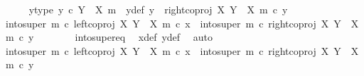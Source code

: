 \begin{isabellebody}
\ \ \ \ \isamarkupfalse%
\ y{\isacharprime}{\kern0pt}{\isacharunderscore}{\kern0pt}type{\isacharcolon}{\kern0pt}\ {\isachardoublequoteopen}y{\isacharprime}{\kern0pt}\ {\isasymin}\isactrlsub c\ Y\ {\isasymsetminus}\ {\isacharparenleft}{\kern0pt}X{\isacharcomma}{\kern0pt}\ m{\isacharparenright}{\kern0pt}{\isachardoublequoteclose}\ \ y{\isacharunderscore}{\kern0pt}def{\isacharcolon}{\kern0pt}\ {\isachardoublequoteopen}y\ {\isacharequal}{\kern0pt}\ right{\isacharunderscore}{\kern0pt}coproj\ X\ {\isacharparenleft}{\kern0pt}Y\ {\isasymsetminus}\ {\isacharparenleft}{\kern0pt}X{\isacharcomma}{\kern0pt}\ m{\isacharparenright}{\kern0pt}{\isacharparenright}{\kern0pt}\ {\isasymcirc}\isactrlsub c\ y{\isacharprime}{\kern0pt}{\isachardoublequoteclose}\isanewline
\isanewline
\ \ \ \ \isamarkupfalse%
\ {\isachardoublequoteopen}into{\isacharunderscore}{\kern0pt}super\ m\ {\isasymcirc}\isactrlsub c\ left{\isacharunderscore}{\kern0pt}coproj\ X\ {\isacharparenleft}{\kern0pt}Y\ {\isasymsetminus}\ {\isacharparenleft}{\kern0pt}X{\isacharcomma}{\kern0pt}\ m{\isacharparenright}{\kern0pt}{\isacharparenright}{\kern0pt}\ {\isasymcirc}\isactrlsub c\ x{\isacharprime}{\kern0pt}\ {\isacharequal}{\kern0pt}\ into{\isacharunderscore}{\kern0pt}super\ m\ {\isasymcirc}\isactrlsub c\ right{\isacharunderscore}{\kern0pt}coproj\ X\ {\isacharparenleft}{\kern0pt}Y\ {\isasymsetminus}\ {\isacharparenleft}{\kern0pt}X{\isacharcomma}{\kern0pt}\ m{\isacharparenright}{\kern0pt}{\isacharparenright}{\kern0pt}\ {\isasymcirc}\isactrlsub c\ y{\isacharprime}{\kern0pt}{\isachardoublequoteclose}\isanewline
\ \ \ \ \ \ \isamarkupfalse%
\ into{\isacharunderscore}{\kern0pt}super{\isacharunderscore}{\kern0pt}eq\ \isamarkupfalse%
\ x{\isacharunderscore}{\kern0pt}def\ y{\isacharunderscore}{\kern0pt}def\ \isamarkupfalse%
\ auto\isanewline
\ \ \ \ \isamarkupfalse%
\ \isamarkupfalse%
\ {\isachardoublequoteopen}{\isacharparenleft}{\kern0pt}into{\isacharunderscore}{\kern0pt}super\ m\ {\isasymcirc}\isactrlsub c\ left{\isacharunderscore}{\kern0pt}coproj\ X\ {\isacharparenleft}{\kern0pt}Y\ {\isasymsetminus}\ {\isacharparenleft}{\kern0pt}X{\isacharcomma}{\kern0pt}\ m{\isacharparenright}{\kern0pt}{\isacharparenright}{\kern0pt}{\isacharparenright}{\kern0pt}\ {\isasymcirc}\isactrlsub c\ x{\isacharprime}{\kern0pt}\ {\isacharequal}{\kern0pt}\ {\isacharparenleft}{\kern0pt}into{\isacharunderscore}{\kern0pt}super\ m\ {\isasymcirc}\isactrlsub c\ right{\isacharunderscore}{\kern0pt}coproj\ X\ {\isacharparenleft}{\kern0pt}Y\ {\isasymsetminus}\ {\isacharparenleft}{\kern0pt}X{\isacharcomma}{\kern0pt}\ m{\isacharparenright}{\kern0pt}{\isacharparenright}{\kern0pt}{\isacharparenright}{\kern0pt}\ {\isasymcirc}\isactrlsub c\ y{\isacharprime}{\kern0pt}{\isachardoublequoteclose}\isanewline

\end{isabellebody}
